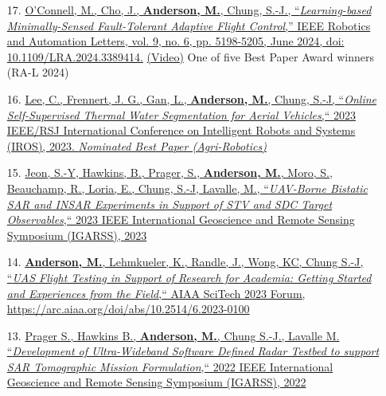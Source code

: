 \documentclass[12pt,letter,sans]{moderncv}
\begin{document}
\begin{itemize}
    \item [17.] \href{https://ieeexplore.ieee.org/document/10502204}
    {O’Connell, M., Cho, J., \underline{\textbf{Anderson, M.}}, Chung, S.-J., ``\textit{Learning-based Minimally-Sensed Fault-Tolerant Adaptive Flight Control},'' IEEE Robotics and Automation Letters, vol. 9, no. 6, pp. 5198-5205, June 2024, doi: 10.1109/LRA.2024.3389414.}
    \href{https://www.youtube.com/watch?v=IzFFEcvQiXw}{(Video)}
    One of five Best Paper Award winners (RA-L 2024)
    
	\item[16.] \href{https://ieeexplore.ieee.org/document/10342016}
	{Lee, C., Frennert, J. G., Gan, L., \underline{\textbf{Anderson, M.}}, Chung, S.-J, ``\textit{Online Self-Supervised Thermal Water Segmentation for Aerial Vehicles},`` 2023 IEEE/RSJ International Conference on Intelligent Robots and Systems (IROS), 2023. \textit{Nominated Best Paper (Agri-Robotics)}}
	
	\item[15.] \href{https://ieeexplore.ieee.org/document/10282077}
	{Jeon, S.-Y, Hawkins, B., Prager, S., \underline{\textbf{Anderson, M.}}, Moro, S., Beauchamp, R., Loria, E., Chung, S.-J, Lavalle, M., ``\textit{UAV-Borne Bistatic SAR and INSAR Experiments in Support of STV and SDC Target Observables},`` 2023 IEEE International Geoscience and Remote Sensing Symposium (IGARSS), 2023}
	    
    \item [14.] \href{https://arc.aiaa.org/doi/10.2514/6.2023-0100}
    { \underline{\textbf{Anderson, M.}}, Lehmkueler, K., Randle, J., Wong, KC, Chung S.-J, ``\textit{UAS Flight Testing in Support of Research for Academia: Getting Started and Experiences from the Field},`` AIAA SciTech 2023 Forum, \url{https://arc.aiaa.org/doi/abs/10.2514/6.2023-0100}}
    
    \item [13.] \href{https://ieeexplore.ieee.org/document/9883873}
    {Prager S., Hawkins B., \underline{\textbf{Anderson, M.}}, Chung S.-J., Lavalle M. ``\textit{Development of Ultra-Wideband Software Defined Radar Testbed to support SAR Tomographic Mission Formulation},`` 2022 IEEE International Geoscience and Remote Sensing Symposium (IGARSS), 2022}
    

\end{itemize}
\end{document}
